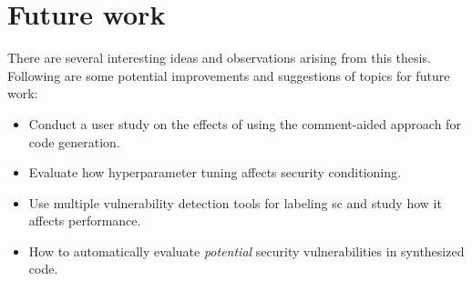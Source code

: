 \section{Future work}
\label{sec:future-works}
There are several interesting ideas and observations arising from this thesis. Following are some potential improvements and suggestions of topics for future work:
\begin{itemize}
    \item Conduct a user study on the effects of using the comment-aided approach for code generation.
    \item Evaluate how hyperparameter tuning affects security conditioning.
    \item Use multiple vulnerability detection tools for labeling \acrshort{sc} and study how it affects performance.
    \item How to automatically evaluate \textit{potential} security vulnerabilities in synthesized code.
\end{itemize}


%
%
%
%
%
%


